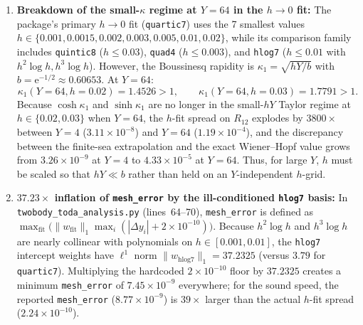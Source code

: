 \documentclass[11pt,a4paper]{article}
\newcommand{\ee}{\mathrm{e}}
\begin{document}
\begin{enumerate}[leftmargin=2em]
  \item \textbf{Breakdown of the small-$\kappa$ regime at $Y=64$ in the $h\to 0$ fit:}
  The package's primary $h\to 0$ fit (\texttt{quartic7}) uses the 7 smallest values $h\in\{0.001,0.0015,0.002,0.003,0.005,0.01,0.02\}$, while its comparison family includes \texttt{quintic8} ($h\le 0.03$), \texttt{quad4} ($h\le 0.003$), and \texttt{hlog7} ($h\le 0.01$ with $h^2\log h, h^3\log h$). However, the Boussinesq rapidity is $\kappa_1=\sqrt{hY/b}$ with $b=\ee^{-1/2}\approx 0.60653$. At $Y=64$:
  \[
    \kappa_1(Y=64, h=0.02) = 1.4526 > 1, \qquad \kappa_1(Y=64, h=0.03) = 1.7791 > 1.
  \]
  Because $\cosh\kappa_1$ and $\sinh\kappa_1$ are no longer in the small-$hY$ Taylor regime at $h\in\{0.02,0.03\}$ when $Y=64$, the $h$-fit spread on $R_{12}$ explodes by $3800\times$ between $Y=4$ ($3.11\times 10^{-8}$) and $Y=64$ ($1.19\times 10^{-4}$), and the discrepancy between the finite-sea extrapolation and the exact Wiener--Hopf value grows from $3.26\times 10^{-9}$ at $Y=4$ to $4.33\times 10^{-5}$ at $Y=64$. Thus, for large $Y$, $h$ must be scaled so that $hY\ll b$ rather than held on an $Y$-independent $h$-grid.

  \item \textbf{$37.23\times$ inflation of \texttt{mesh\_error} by the ill-conditioned \texttt{hlog7} basis:}
  In \texttt{twobody\_toda\_analysis.py} (lines~64--70), \texttt{mesh\_error} is defined as $\max_{\text{fit}}\bigl(\|w_{\text{fit}}\|_1\max_i(|\Delta y_i|+2\times 10^{-10})\bigr)$. Because $h^2\log h$ and $h^3\log h$ are nearly collinear with polynomials on $h\in[0.001,0.01]$, the \texttt{hlog7} intercept weights have $\ell^1$ norm $\|w_{\text{hlog7}}\|_1 = 37.2325$ (versus $3.79$ for \texttt{quartic7}). Multiplying the hardcoded $2\times 10^{-10}$ floor by $37.2325$ creates a minimum \texttt{mesh\_error} of $7.45\times 10^{-9}$ everywhere; for the sound speed, the reported \texttt{mesh\_error} ($8.77\times 10^{-9}$) is $39\times$ larger than the actual $h$-fit spread ($2.24\times 10^{-10}$).


\end{enumerate}
\end{document}
